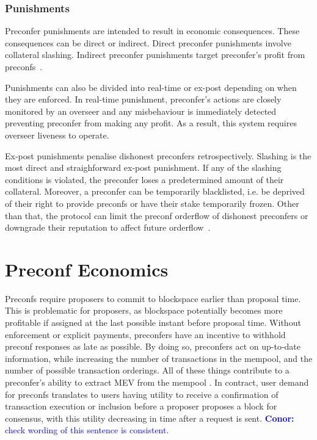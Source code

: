 \documentclass[a4paper]{article}
\theoremstyle{boldstyle}
\newcommand{\cm}[1]{\textcolor{blue}{\textbf{Conor:} #1}}
\begin{document}
    \subsubsection{Punishments}
    
    Preconfer punishments are intended to result in economic consequences. These consequences can be direct or indirect. Direct preconfer punishments involve collateral slashing. Indirect preconfer punishments target preconfer's profit from preconfs~\cite{W:PreconfirmationFairExchange}. 
    
    Punishments can also be divided into real-time or ex-post depending on when they are enforced. In real-time punishment, preconfer's actions are closely monitored by an overseer and any misbehaviour is immediately detected preventing preconfer from making any profit. As a result, this system requires overseer liveness to operate. 
    
    Ex-post punishments penalise dishonest preconfers retrospectively. Slashing is the most direct and straighforward ex-post punishment. If any of the slashing conditions is violated, the preconfer loses a predetermined amount of their collateral. Moreover, a preconfer can be temporarily blacklisted, i.e. be deprived of their right to provide preconfs or have their stake temporarily frozen. Other than that, the protocol can limit the preconf orderflow of dishonest preconfers or downgrade their reputation to affect future orderflow~\cite{W:PreconfirmationFairExchange,W:User-DefinedPenalties:EnsuringHonestPreconfBehavior}.




\section*{Preconf Economics}
Preconfs require proposers to commit to blockspace earlier than proposal time. This is problematic for proposers, as blockspace potentially becomes more profitable if assigned at the last possible instant before proposal time. Without enforcement or explicit payments, preconfers have an incentive to withhold preconf responses as late as possible. By doing so, preconfers act on up-to-date information, while increasing the number of transactions in the mempool, and the number of possible transaction orderings. All of these things contribute to a preconfer's ability to extract MEV from the mempool \cite{W:AnalyzingBFTProposer-PromisedPreconfirmations,W:StrawmanningBasedPreconfirmations}. In contract, user demand for preconfs translates to users having utility to receive a confirmation of transaction execution or inclusion before a proposer proposes a block for consensus, with this utility decreasing in time after a request is sent. \cm{check wording of this sentence is consistent}.
\end{document}
